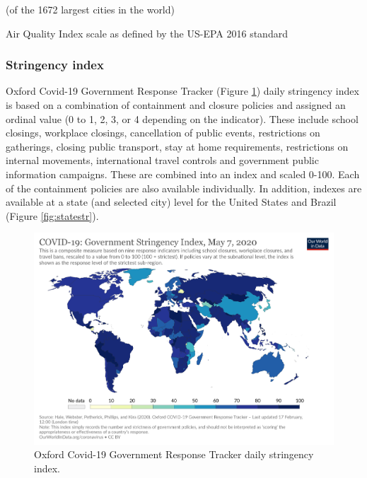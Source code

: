 \documentclass[final,3p,times,authoryear]{elsarticle}
\begin{document}
(of the 1672 largest cities in the world\citep{UNDESA2015})

Air Quality Index scale as defined by the US-EPA 2016 standard

\subsubsection{Stringency index}

Oxford Covid-19 Government Response Tracker \citep{Hale2020} (Figure \ref{fig:oxcgrt}) daily stringency index is based on a combination of containment and closure policies and assigned an ordinal value (0 to 1, 2, 3, or 4 depending on the indicator). These include school closings, workplace closings, cancellation of public events, restrictions on gatherings, closing public transport, stay at home requirements, restrictions on internal movements, international travel controls and government public information campaigns. These are combined into an index and scaled 0-100. Each of the containment policies are also available individually. In addition, indexes are available at a state (and selected city) level for the United States and Brazil \citep{Hale2020a,Petherick2020} (Figure \ref{fig:statestr}).




\begin{figure}
\centering
\includegraphics[width=.99\linewidth]{images/covid-stringency-index.png}
\caption{Oxford Covid-19 Government Response Tracker daily stringency index.}
 \label{fig:oxcgrt}
\end{figure} 
\end{document}
